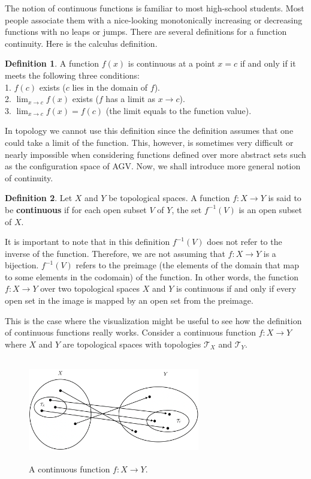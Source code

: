 \documentclass[12pt]{article}
\newcommand{\topology}{\mathcal{T}}                       %
\newcommand{\rarr}{\rightarrow}                           %
\theoremstyle{definition}
\newtheorem*{definition}{Definition}
\begin{document}
The notion of continuous functions is familiar to most high-school students.
Most people associate them with a nice-looking monotonically increasing or decreasing
functions with no leaps or jumps. There are several definitions for a function continuity.
Here is the calculus definition.

\begin{definition}
\cite{5} A function $f(x)$ is continuous at a point $x = c$ if and only if it meets the following
three conditions:\\
1. $f(c)$ exists ($c$ lies in the domain of $f$).\\
2. $\lim_{x \to c}f(x)$ exists ($f$ has a limit as $x \to c$).\\
3. $\lim_{x \to c}f(x) = f(c)$ (the limit equals to the function value).
\end{definition}

In topology we cannot use this definition since the definition assumes
that one could take a limit of the function. This, however, is sometimes very difficult or nearly impossible
when considering functions defined over more abstract sets such as the configuration space
of AGV. Now, we shall introduce more general notion of continuity.

\begin{definition}
\cite{6} Let $X$ and $Y$ be topological spaces. A function $f : X \to Y$ is said to be \textbf{continuous} if
for each open subset $V$ of $Y$, the set $f^{-1}(V)$ is an open subset of $X$.
\end{definition}

It is important to note that in this definition $f^{-1}(V)$ does not refer to the inverse of the function.
Therefore, we are not assuming that $f : X \rarr Y$ is a bijection. $f^{-1}(V)$ refers to the preimage
(the elements of the domain that map to some elements in the codomain) of the function. In other words,
the function $f : X \to Y$ over two topological spaces $X$ and $Y$ is continuous if and only if every open
set in the image is mapped by an open set from the preimage.

\bigskip

This is the case where the visualization might be useful to see how the definition of continuous functions really works.
Consider a continuous function $f : X \to Y$ where $X$ and $Y$ are topological spaces with topologies $\topology_X$ and $\topology_Y$.

\begin{figure}[H]
    \centering
    \includegraphics[width=7.5cm, height=4.5cm]{continuous-function}
    \caption*{A continuous function $f : X \to Y$.}
\end{figure}
\end{document}
